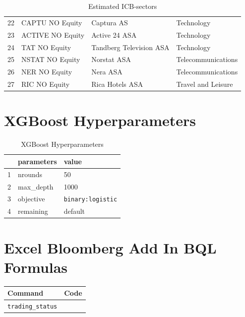 \begin{appendices}
\begin{table}[H]
\begin{tabularx}{\textwidth}{lXXX}
22 & CAPTU NO Equity & Captura AS & Technology \\ 
23 & ACTIVE NO Equity & Active 24 ASA & Technology \\ 
24 & TAT NO Equity & Tandberg Television ASA & Technology \\ 
25 & NSTAT NO Equity & Norstat ASA & Telecommunications \\ 
26 & NER NO Equity & Nera ASA & Telecommunications \\ 
27 & RIC NO Equity & Rica Hotels ASA & Travel and Leisure \\ 
\hline
\end{tabularx}
\vspace{1em}
\caption{Estimated ICB-sectors}
\label{from-gics-to-icb}
\end{table}


\newpage

\section{XGBoost Hyperparameters}
\label{xgb-hyperparameters}
\begin{table}[H]
\centering
\begin{tabular}{rll}
\toprule
 & parameters & value \\ 
\midrule
1 & nrounds & 50 \\ 
  2 & max\_depth & 1000 \\ 
  3 & objective & \texttt{binary:logistic} \\ 
  4 & remaining & default \\ 
\bottomrule
\end{tabular}
\vspace{1em}
\caption{{XGBoost Hyperparameters}}
\end{table}



\section{Excel Bloomberg Add In BQL Formulas}
\label{APPENDIX-Excel-Bloomberg-Add-In-BQL-Formulas}
\begin{table}[H]
\centering
\begin{tabular}{ll}
\hline
Command & Code \\ 
\hline
\texttt{trading\_status} & \begin{minipage}[t]{0.6\textwidth}


\end{minipage}
\end{tabular}
\end{table}
\end{appendices}
